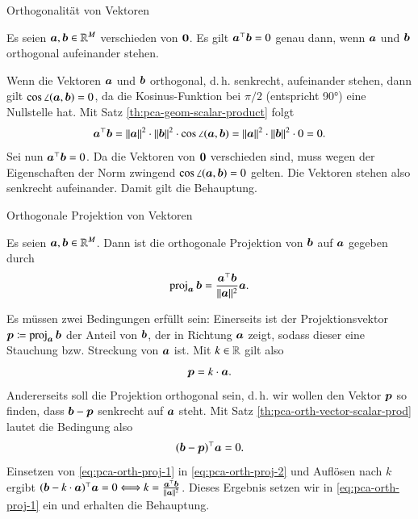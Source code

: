 \begin{frame}{Orthogonalität von Vektoren}{}
	\begin{mytheo}
		Es seien $\bm{a}, \bm{b} \in \mathbb{R}^M$ verschieden von $\bm{0}$. Es gilt $\bm{a}^\top \bm{b} = 0$ genau dann,
		wenn $\bm{a}$ und $\bm{b}$ orthogonal aufeinander stehen.
	\end{mytheo}

	\begin{myproof}
		Wenn die Vektoren $\bm{a}$ und $\bm{b}$ orthogonal, d.\,h. senkrecht, aufeinander stehen, dann gilt $\cos \angle(\bm{a}, \bm{b}) = 0$,
		da die Kosinus-Funktion bei $\pi/2$ (entspricht 90°) eine Nullstelle hat. Mit Satz \ref{th:pca-geom-scalar-product} folgt
		\begin{equation*}
			\bm{a}^\top \bm{b}
				= \Vert \bm{a} \Vert^2 \cdot \Vert \bm{b} \Vert^2 \cdot \cos \angle(\bm{a}, \bm{b})
				= \Vert \bm{a} \Vert^2 \cdot \Vert \bm{b} \Vert^2 \cdot 0
				= 0.
		\end{equation*}
		Sei nun $\bm{a}^\top \bm{b} = 0$. Da die Vektoren von $\bm{0}$ verschieden sind, muss wegen der Eigenschaften der Norm
		zwingend $\cos \angle(\bm{a}, \bm{b}) = 0$ gelten. Die Vektoren stehen also senkrecht aufeinander. Damit gilt die Behauptung.
	\end{myproof}
\end{frame}


\begin{frame}{Orthogonale Projektion von Vektoren}{}
	\begin{mytheo}
		Es seien $\bm{a}, \bm{b} \in \mathbb{R}^M$. Dann ist die orthogonale Projektion von $\bm{b}$ auf $\bm{a}$ gegeben durch
		\begin{equation*}
			\operatorname{\text{proj}}_{\bm{a}} \bm{b} = \frac{\bm{a}^\top \bm{b}}{\Vert \bm{a} \Vert^2} \bm{a}.
		\end{equation*}
	\end{mytheo}

	\begin{myproof}
		Es müssen zwei Bedingungen erfüllt sein: Einerseits ist der Projektionsvektor $\bm{p} \coloneqq \operatorname{\text{proj}}_{\bm{a}} \bm{b}$ der Anteil von $\bm{b}$,
		der in Richtung $\bm{a}$ zeigt, sodass dieser eine Stauchung bzw. Streckung von $\bm{a}$ ist. Mit $k \in \mathbb{R}$ gilt also
		\begin{equation} \label{eq:pca-orth-proj-1}
			\bm{p} = k \cdot \bm{a}.
		\end{equation}
		Andererseits soll die Projektion orthogonal sein, d.\,h. wir wollen den Vektor $\bm{p}$ so finden,
		dass $\bm{b} - \bm{p}$ senkrecht auf $\bm{a}$ steht. Mit Satz \ref{th:pca-orth-vector-scalar-prod} lautet die Bedingung also
		\begin{equation} \label{eq:pca-orth-proj-2}
			(\bm{b} - \bm{p})^\top \bm{a} = 0.
		\end{equation}
		Einsetzen von \eqref{eq:pca-orth-proj-1} in \eqref{eq:pca-orth-proj-2} und Auflösen nach $k$ ergibt
		$(\bm{b} - k \cdot \bm{a})^\top \bm{a} = 0 \Longleftrightarrow k = \frac{\bm{a}^\top \bm{b}}{\Vert \bm{a} \Vert^2}$.
		Dieses Ergebnis setzen wir in \eqref{eq:pca-orth-proj-1} ein und erhalten die Behauptung.
	\end{myproof}
\end{frame}


